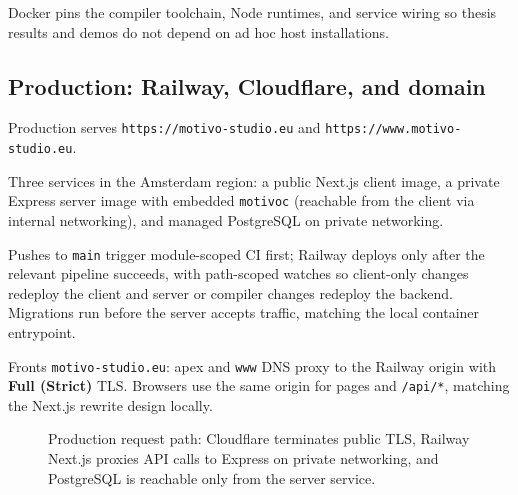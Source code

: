 Docker pins the compiler toolchain, Node runtimes, and service wiring so thesis results and demos do not depend on ad
hoc host installations.

\subsection{Production: Railway, Cloudflare, and domain}\label{subsec:production-railway}

Production serves \texttt{https://motivo-studio.eu} and \texttt{https://www.motivo-studio.eu}.

 Three services in the Amsterdam region: a public Next.js client image, a private Express server image
with embedded \texttt{motivoc} (reachable from the client via internal networking), and managed PostgreSQL on private
networking.

Pushes to \texttt{main} trigger module-scoped CI first; Railway deploys only after the relevant pipeline succeeds,
with path-scoped watches so client-only changes redeploy the client and server or compiler changes redeploy the
backend. Migrations run before the server accepts traffic, matching the local container entrypoint.

 Fronts \texttt{motivo-studio.eu}: apex and \texttt{www} DNS proxy to the Railway origin with
\textbf{Full (Strict)} TLS. Browsers use the same origin for pages and \texttt{/api/*}, matching the Next.js rewrite
design locally.

\begin{figure}[htbp]
  \centering
  \caption{Production request path: Cloudflare terminates public TLS, Railway Next.js proxies API calls to Express on
  private networking, and PostgreSQL is reachable only from the server service.}\label{fig:deployment-production}
\end{figure}

